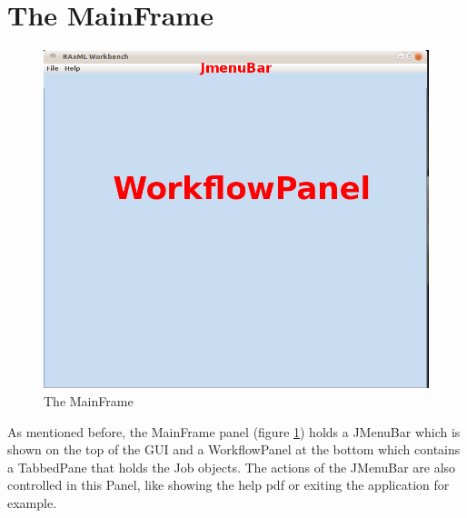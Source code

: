 \documentclass{scrartcl}
\begin{document}
\section{The MainFrame}
	\begin{figure}[htb]
		\centering
		\includegraphics[scale=0.2]{./MainFrame}
		\caption{The MainFrame}
		\label{fig:mainframe}
	\end{figure}
\noindent	As mentioned before, the MainFrame panel (figure \ref{fig:mainframe}) holds  a JMenuBar which is shown on the top of the GUI and a WorkflowPanel at the bottom which contains a TabbedPane that holds the Job objects. The actions of the JMenuBar are also controlled in this Panel, like showing the help pdf or exiting the application for example.
\end{document}
